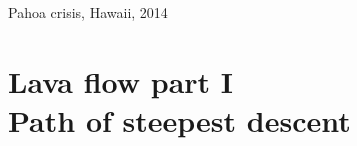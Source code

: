 \documentclass[10pt,aspectratio=169]{beamer}
\begin{document}
\begin{frame}{Pahoa crisis, Hawaii, 2014}
\end{frame}


\section{\alert{Lava flow part I} \\Path of steepest descent}
\end{document}

